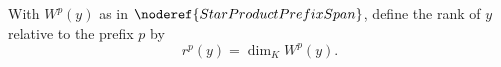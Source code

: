 \begin{definition}
With \(W^p(y)\) as in \(\noderef{StarProductPrefixSpan}\), define the
rank of \(y\) relative to the prefix \(p\) by
\[
  r^p(y)=\dim_K W^p(y).
\]
\end{definition}
